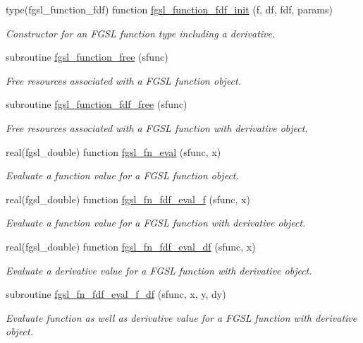 \begin{DoxyCompactItemize}
type(fgsl\-\_\-function\-\_\-fdf) function \hyperlink{math_8finc_abb3c595b71761c1825021ce600493f75}{fgsl\-\_\-function\-\_\-fdf\-\_\-init} (f, df, fdf, params)
\begin{DoxyCompactList}\small\item\em Constructor for an F\-G\-S\-L function type including a derivative. \end{DoxyCompactList}\item 
subroutine \hyperlink{math_8finc_a2119e5b0091febc676ee418b8b211bf5}{fgsl\-\_\-function\-\_\-free} (sfunc)
\begin{DoxyCompactList}\small\item\em Free resources associated with a F\-G\-S\-L function object. \end{DoxyCompactList}\item 
subroutine \hyperlink{math_8finc_a03e913de6c833197efae52ed50290cfb}{fgsl\-\_\-function\-\_\-fdf\-\_\-free} (sfunc)
\begin{DoxyCompactList}\small\item\em Free resources associated with a F\-G\-S\-L function with derivative object. \end{DoxyCompactList}\item 
real(fgsl\-\_\-double) function \hyperlink{math_8finc_a6c38a834ecc0149664dbb667f104fcce}{fgsl\-\_\-fn\-\_\-eval} (sfunc, x)
\begin{DoxyCompactList}\small\item\em Evaluate a function value for a F\-G\-S\-L function object. \end{DoxyCompactList}\item 
real(fgsl\-\_\-double) function \hyperlink{math_8finc_a76c063c0086a88bd27f75c808041b9dd}{fgsl\-\_\-fn\-\_\-fdf\-\_\-eval\-\_\-f} (sfunc, x)
\begin{DoxyCompactList}\small\item\em Evaluate a function value for a F\-G\-S\-L function with derivative object. \end{DoxyCompactList}\item 
real(fgsl\-\_\-double) function \hyperlink{math_8finc_a67a49e7d1dec1c5c407e1ccd62db581a}{fgsl\-\_\-fn\-\_\-fdf\-\_\-eval\-\_\-df} (sfunc, x)
\begin{DoxyCompactList}\small\item\em Evaluate a derivative value for a F\-G\-S\-L function with derivative object. \end{DoxyCompactList}\item 
subroutine \hyperlink{math_8finc_a950ecd7cffcfa33d10a2b8db5c6befcd}{fgsl\-\_\-fn\-\_\-fdf\-\_\-eval\-\_\-f\-\_\-df} (sfunc, x, y, dy)
\begin{DoxyCompactList}\small\item\em Evaluate function as well as derivative value for a F\-G\-S\-L function with derivative object. \end{DoxyCompactList}\end{DoxyCompactItemize}


